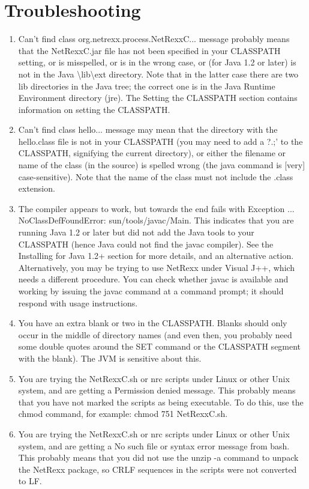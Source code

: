 \chapter{Troubleshooting}
\begin{enumerate} 
\item Can't find class org.netrexx.process.NetRexxC... message
  probably means that the NetRexxC.jar file has not been specified in
  your CLASSPATH setting, or is misspelled, or is in the wrong case,
  or (for Java 1.2 or later) is not in the Java
  \textbackslash lib\textbackslash ext directory. Note that in the latter case there are two lib directories in the Java tree; the correct one is in the Java Runtime Environment directory (jre).
The Setting the CLASSPATH section contains information on setting the CLASSPATH.
\item Can't find class hello... message may mean that the directory with the hello.class file is not in your CLASSPATH (you may need to add a ?.;’ to the CLASSPATH, signifying the current directory), or either the filename or name of the class (in the source) is spelled wrong (the java command is [very] case-sensitive). Note that the name of the class must not include the .class extension.
\item The compiler appears to work, but towards the end fails with Exception ... NoClassDefFoundError: sun/tools/javac/Main. This indicates that you are running Java 1.2 or later but did not add the Java tools to your CLASSPATH (hence Java could not find the javac compiler). See the Installing for Java 1.2+ section for more details, and an alternative action.
Alternatively, you may be trying to use NetRexx under Visual J++, which needs a different procedure. You can check whether javac is available and working by issuing the javac command at a command prompt; it should respond with usage instructions.
\item You have an extra blank or two in the CLASSPATH. Blanks should only occur in the middle of directory names (and even then, you probably need some double quotes around the SET command or the CLASSPATH segment with the blank). The JVM is sensitive about this.
\item You are trying the NetRexxC.sh or nrc scripts under Linux or other Unix system, and are getting a Permission denied message. This probably means that you have not marked the scripts as being executable. To do this, use the chmod command, for example: chmod 751 NetRexxC.sh.
\item You are trying the NetRexxC.sh or nrc scripts under Linux or other Unix system, and are getting a No such file or syntax error message from bash. This probably means that you did not use the unzip -a command to unpack the NetRexx package, so CRLF sequences in the scripts were not converted to LF.

\end{enumerate}
